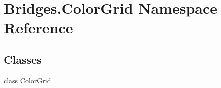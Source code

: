 \hypertarget{namespace_bridges_1_1_color_grid}{}\section{Bridges.\+Color\+Grid Namespace Reference}
\label{namespace_bridges_1_1_color_grid}
\subsection*{Classes}
\begin{DoxyCompactItemize}
\item 
class \mbox{\hyperlink{class_bridges_1_1_color_grid_1_1_color_grid}{Color\+Grid}}
\end{DoxyCompactItemize}
